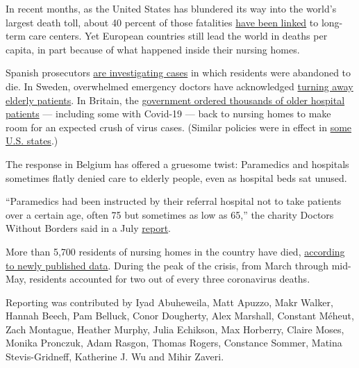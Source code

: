 In recent months, as the United States has blundered its way into the
world's largest death toll, about 40 percent of those fatalities
\href{https://www.kff.org/health-costs/issue-brief/state-data-and-policy-actions-to-address-coronavirus/\#stateleveldata}{have
been linked} to long-term care centers. Yet European countries still
lead the world in deaths per capita, in part because of what happened
inside their nursing homes.

Spanish prosecutors
\href{https://www.nytimes.com/2020/03/25/world/europe/Spain-coronavirus-nursing-homes.html}{are
investigating cases} in which residents were abandoned to die. In
Sweden, overwhelmed emergency doctors have acknowledged
\href{https://www.dn.se/nyheter/sverige/overlakare-logn-att-patienter-inte-prioriterats-bort/}{turning
away elderly patients}. In Britain, the
\href{https://www.independent.co.uk/news/health/coronavirus-care-homes-nhs-hospital-discharges-deaths-a9544671.html}{government
ordered thousands of older hospital patients} --- including some with
Covid-19 --- back to nursing homes to make room for an expected crush of
virus cases. (Similar policies were in effect in
\href{https://www.nytimes.com/2020/04/24/us/nursing-homes-coronavirus.html}{some
U.S. states}.)

The response in Belgium has offered a gruesome twist: Paramedics and
hospitals sometimes flatly denied care to elderly people, even as
hospital beds sat unused.

``Paramedics had been instructed by their referral hospital not to take
patients over a certain age, often 75 but sometimes as low as 65,'' the
charity Doctors Without Borders said in a July
\href{https://www.msf.org/sites/msf.org/files/2020-07/Left\%20behind\%20-\%20MSF\%20care\%20homes\%20in\%20Belgium\%20report.pdf}{report}.

More than 5,700 residents of nursing homes in the country have died,
\href{https://www.medrxiv.org/content/10.1101/2020.06.20.20136234v1.full.pdf}{according
to newly published data}. During the peak of the crisis, from March
through mid-May, residents accounted for two out of every three
coronavirus deaths.

Reporting was contributed by Iyad Abuheweila, Matt Apuzzo, Makr Walker,
Hannah Beech, Pam Belluck, Conor Dougherty, Alex Marshall, Constant
Méheut, Zach Montague, Heather Murphy, Julia Echikson, Max Horberry,
Claire Moses, Monika Pronczuk, Adam Rasgon, Thomas Rogers, Constance
Sommer, Matina Stevis-Gridneff, Katherine J. Wu and Mihir Zaveri.

